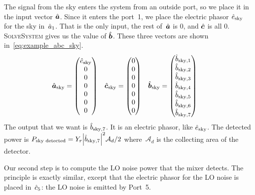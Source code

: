 The signal from the sky enters the system from an outside port, so we place it in the input vector $\hat{\bm{a}}$.
Since it enters the port~1, we place the electric phasor $\hat{e}_\text{sky}$ for the sky in~$\hat{a}_1$.
That is the only input, the rest of~$\hat{\bm{a}}$ is 0, and $\hat{\bm{c}}$ is all 0.
\textsc{SolveSystem} gives us the value of $\hat{\bm{b}}$.
These three vectors are shown in~\cref{eq:example_abc_sky}.
\begin{align}
    \hat{\bm{a}}_\text{sky}
    &=
    \begin{pmatrix}
        \hat{e}_\text{sky} \\ 0 \\ 0 \\ 0 \\ 0 \\ 0 \\ 0
    \end{pmatrix}
    &
    \hat{\bm{c}}_\text{sky}
    &=
    \begin{pmatrix}
        0 \\ 0 \\ 0 \\ 0 \\ 0 \\ 0 \\ 0
    \end{pmatrix}
    &
    \hat{\bm{b}}_\text{sky}
    &=
    \begin{pmatrix}
        \hat{b}_{\text{sky},1}\\
        \hat{b}_{\text{sky},2}\\
        \hat{b}_{\text{sky},3}\\
        \hat{b}_{\text{sky},4}\\
        \hat{b}_{\text{sky},5}\\
        \hat{b}_{\text{sky},6}\\
        \hat{b}_{\text{sky},7}
    \end{pmatrix}
    \label{eq:example_abc_sky}
\end{align}
The output that we want is $\hat{b}_{\text{sky},7}$.
It is an electric phasor, like $\hat{e}_\text{sky}$.
The detected power is
$P_\text{sky detected} = Y_r\abs{\cp{b}_{\text{sky},7}}^2 \mathcal{A}_d/ 2$
where~$\mathcal{A}_d$ is the collecting area of the detector.

Our second step is to compute the LO noise power that the mixer detects.
The principle is exactly similar, except that the electric phasor for the LO noise is placed in~$\hat{c}_5$: the LO noise is emitted by Port~5.

